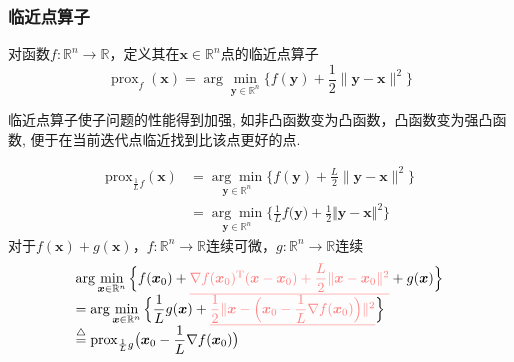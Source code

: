 \subsubsection{临近点算子}
\begin{definition}[临近点算子]
    对函数$f:\mathbb{R}^n\to\mathbb{R}$，定义其在$\boldsymbol{x}\in\mathbb{R}^n$点的临近点算子
    \[
        \operatorname{prox}_f(\boldsymbol{x})=\arg\min_{\boldsymbol{y}\in\mathbb{R}^n}\Big\{f(\boldsymbol{y})+\frac{1}{2}\|\boldsymbol{y}-\boldsymbol{x}\|^2\Big\}
    \]
\end{definition}
\begin{note}
    临近点算子使子问题的性能得到加强, 如非凸函数变为凸函数，凸函数变为强凸函数, 便于在当前迭代点临近找到比该点更好的点.
\end{note}
\begin{definition}[临近点算子的扩展]
    \[
        \begin{aligned}
            \mathrm{prox}_{\frac{1}{L}f}(\boldsymbol{x})& =\underset{\boldsymbol{y}\in\mathbb{R}^{n}}{\arg\min}\Big\{f(\boldsymbol{y})+\frac{L}{2}\|\boldsymbol{y}-\boldsymbol{x}\|^{2}\Big\}  \\
            &=\underset{\boldsymbol{y}\in\mathbb{R}^{n}}{\arg\min}\Big\{\frac{1}{L}f\big(\boldsymbol{y}\big)+\frac{1}{2}\big\Vert\boldsymbol{y}-\boldsymbol{x}\big\Vert^{2}\Big\}
        \end{aligned}
    \]
    对于$f(\boldsymbol{x})+g(\boldsymbol{x})$，$f:\mathbb{R}^n\to\mathbb{R}$连续可微，$g:\mathbb{R}^n\to\mathbb{R}$连续
    \[
        \begin{array}{l}
            \arg\min\limits_{\boldsymbol{x}\in\mathbb{R}^{n}}\Big\{f(\boldsymbol{x}_{0})+\textcolor{red!50}{\underline{\nabla f(\boldsymbol{x}_{0})^{\mathrm{T}}(\boldsymbol{x}-\boldsymbol{x}_{0})+\dfrac{L}{2}\|\boldsymbol{x}-\boldsymbol{x}_{0}\|^{2}}}+g(\boldsymbol{x})\Big\}\\
            =\arg\operatorname*{min}\limits_{\boldsymbol{x}\in\mathbb{R}^{n}}\Big\{\dfrac{1}{L}g(\boldsymbol{x})+\textcolor{red!50}{\underline{\dfrac{1}{2}\|\boldsymbol{x}-\Big(\boldsymbol{x}_{0}-\dfrac{1}{L}\nabla f(\boldsymbol{x}_{0})\Big)\|^{2}}}\Big\}\\
            \stackrel{\triangle}{=}\mathrm{prox}_{\frac{1}{L}g}\bigl(\boldsymbol{x}_{0}-\dfrac{1}{L}\nabla f(\boldsymbol{x}_{0})\bigr)
        \end{array}
    \]
\end{definition}
